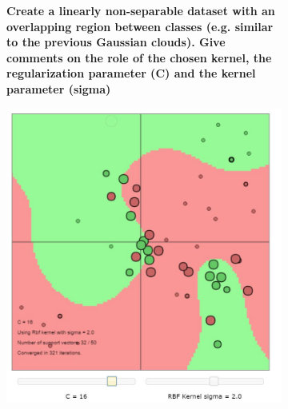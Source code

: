\documentclass[11pt,oneside,a4paper]{article}
\begin{document}
 \begin{figure}[h!]
 	\centering
 	\begin{subfigure}[b]{.5\textwidth}
 		
 	\textbf{Create a linearly non-separable dataset with an overlapping region between classes (e.g. similar to the previous Gaussian clouds). Give comments on the role of the chosen kernel, the regularization parameter (C) and the kernel parameter (sigma)}\\
 		
 		
 		
 		
 		
 	\end{subfigure}%
 	\begin{subfigure}{.5\textwidth}
 		\vspace{-185pt}
 		\centering
 		\includegraphics[width=0.9\linewidth]{../Figures/RBF_non_linear_data}
 	\end{subfigure}
 \end{figure}
\end{document}
